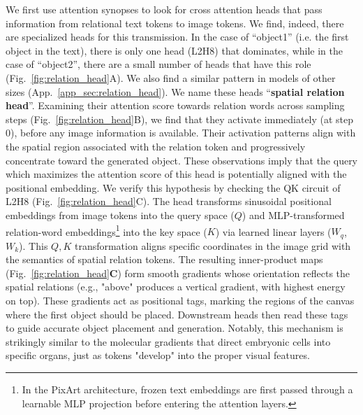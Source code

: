 \documentclass[10pt,twocolumn,letterpaper]{article}
\begin{document}
We first use attention synopses to look for cross attention heads that pass information from relational text tokens to image tokens. We find, indeed, there are specialized heads for this transmission. In the case of ``object1'' (i.e. the first object in the text), there is only one head (L2H8) that dominates, while in the case of ``object2'', there are a small number of heads that have this role (Fig.~\ref{fig:relation_head}A). We also find a similar pattern in models of other sizes (App.~\ref{app_sec:relation_head}). %
We name these heads ``\textbf{spatial relation head}''. Examining their attention score towards relation words across sampling steps (Fig.~\ref{fig:relation_head}B), we find that they activate immediately (at step 0), before any image information is available. Their activation patterns align with the spatial region associated with the relation token and progressively concentrate toward the generated object. These observations imply that the query which maximizes the attention score of this head is potentially aligned with the positional embedding. 
We verify this hypothesis by checking the QK circuit \cite{elhage2021mathematical} of L2H8 (Fig.~\ref{fig:relation_head}C). The head transforms sinusoidal positional embeddings from image tokens into the query space ($Q$) and MLP-transformed relation-word embeddings\footnote{In the PixArt architecture, frozen text embeddings are first passed through a learnable MLP projection before entering the attention layers.} into the key space ($K$) via learned linear layers ($W_q$, $W_k$).
This $Q, K$ transformation aligns specific coordinates in the image grid with the semantics of spatial relation tokens. The resulting inner-product maps (Fig.~\ref{fig:relation_head}\textbf{C}) form smooth gradients whose orientation reflects the spatial relations (e.g., "above" produces a vertical gradient, with highest energy on top). These gradients act as positional tags, marking the regions of the canvas where the first object should be placed. Downstream heads then read these tags to guide accurate object placement and generation. Notably, this mechanism is strikingly similar to the molecular gradients that direct embryonic cells into specific organs, just as tokens "develop" into the proper visual features.


\end{document}

